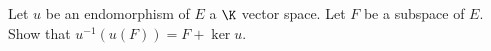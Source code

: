 Let $u$ be an endomorphism of $E$ a $\K$ vector space. Let $F$ be a subspace of $E$.
Show that $u^{-1}(u(F)) = F + \ker u$.
